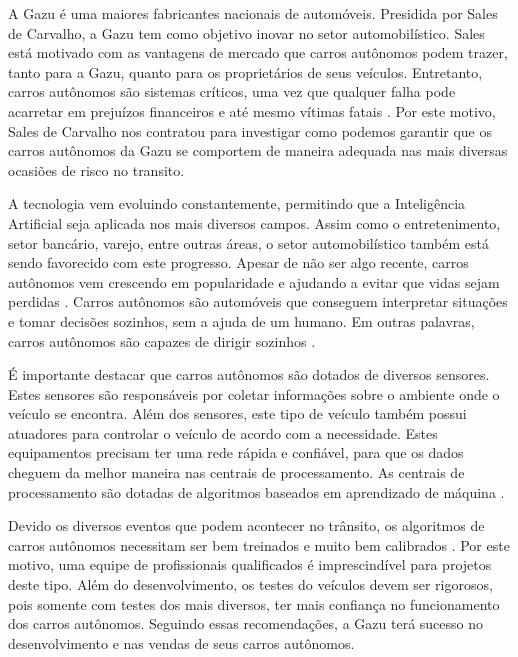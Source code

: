 A Gazu é uma maiores fabricantes nacionais de automóveis. Presidida por Sales de Carvalho, a Gazu tem como objetivo inovar no setor automobilístico. Sales está motivado com as vantagens de mercado que carros autônomos podem trazer, tanto para a Gazu, quanto para os proprietários de seus veículos. Entretanto, carros autônomos são sistemas críticos, uma vez que qualquer falha pode acarretar em prejuízos financeiros e até mesmo vítimas fatais \cite{efing2020uso}. Por este motivo, Sales de Carvalho nos contratou para investigar como podemos garantir que os carros autônomos da Gazu se comportem de maneira adequada nas mais diversas ocasiões de risco no transito.


A tecnologia vem evoluindo constantemente, permitindo que a Inteligência Artificial seja aplicada nos mais diversos campos. Assim como o entretenimento, setor bancário, varejo, entre outras áreas, o setor automobilístico também está sendo favorecido com este progresso. Apesar de não ser algo recente, carros autônomos vem crescendo em popularidade e ajudando a evitar que vidas sejam perdidas \cite{caetano2020algoritmos}. Carros autônomos são automóveis que conseguem interpretar situações e tomar decisões sozinhos, sem a ajuda de um humano. Em outras palavras, carros autônomos são capazes de dirigir sozinhos \cite{de2018futuro}.

É importante destacar que carros autônomos são dotados de diversos sensores. Estes sensores são responsáveis por coletar informações sobre o ambiente onde o veículo se encontra. Além dos sensores, este tipo de veículo também possui atuadores para controlar o veículo de acordo com a necessidade. Estes equipamentos precisam ter uma rede rápida e confiável, para que os dados cheguem da melhor maneira nas centrais de processamento. As centrais de processamento são dotadas de algoritmos baseados em aprendizado de máquina \cite{trindade2018detecccao}. 

Devido os diversos eventos que podem acontecer no trânsito, os algoritmos de carros autônomos necessitam ser bem treinados e muito bem calibrados \cite{caetano2020algoritmos}. Por este motivo, uma equipe de profissionais qualificados é imprescindível para projetos deste tipo. Além do desenvolvimento, os testes do veículos devem ser rigorosos, pois somente com testes dos mais diversos, ter mais confiança no funcionamento dos carros autônomos. Seguindo essas recomendações, a Gazu terá sucesso no desenvolvimento e nas vendas de seus carros autônomos.